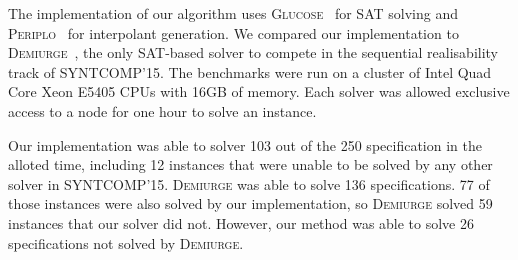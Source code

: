 \documentclass{llncs}
\begin{document}
\begin{figure}[h]
    \centering
\end{figure}

The implementation of our algorithm uses \textsc{Glucose}~\cite{audemard2014}
for SAT solving and \textsc{Periplo}~\cite{rollini2013} for interpolant
generation. We compared our implementation to
\textsc{Demiurge}~\cite{bloem2014}, the only SAT-based solver to compete in the
sequential realisability track of SYNTCOMP'15. The benchmarks were run on a
cluster of Intel Quad Core Xeon E5405 CPUs with 16GB of memory.  Each solver
was allowed exclusive access to a node for one hour to solve an instance.

Our implementation was able to solver 103 out of the 250 specification in the
alloted time, including 12 instances that were unable to be solved by any other
solver in SYNTCOMP'15. \textsc{Demiurge} was able to solve 136 specifications.
77 of those instances were also solved by our implementation, so
\textsc{Demiurge} solved 59 instances that our solver did not. However, our
method was able to solve 26 specifications not solved by \textsc{Demiurge}.
\end{document}
